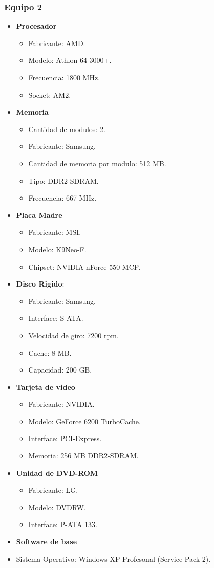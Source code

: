 \subsubsection{Equipo 2}
\begin{itemize}
\item \textbf{Procesador}
	\begin{itemize}
	\item Fabricante: AMD.	
	\item Modelo: Athlon 64 3000+.
	\item Frecuencia: 1800 MHz.
	\item Socket: AM2.
	\end{itemize}
\item \textbf{Memoria}
	\begin{itemize}
	\item Cantidad de modulos: 2.
	\item Fabricante: Samsung.
	\item Cantidad de memoria por modulo: 512 MB.
	\item Tipo: DDR2-SDRAM.
	\item Frecuencia: 667 MHz.
	\end{itemize}
\item \textbf{Placa Madre}
	\begin{itemize}
	\item Fabricante: MSI.	
	\item Modelo: K9Neo-F.
	\item Chipset: NVIDIA nForce 550 MCP.
	\end{itemize}
\item \textbf{Disco Rigido}:
	\begin{itemize}
	\item Fabricante: Samsung.	
	\item Interface: S-ATA.
	\item Velocidad de giro: 7200 rpm.
	\item Cache: 8 MB.
	\item Capacidad: 200 GB.
	\end{itemize}
\item \textbf{Tarjeta de video}
	\begin{itemize}
	\item Fabricante: NVIDIA.
	\item Modelo: GeForce 6200 TurboCache.
	\item Interface: PCI-Express.
	\item Memoria: 256 MB DDR2-SDRAM.
	\end{itemize}
\item \textbf{Unidad de DVD-ROM}
	\begin{itemize}
	\item Fabricante: LG.
	\item Modelo: DVDRW.
	\item Interface: P-ATA 133.
	\end{itemize}
\item \textbf{Software de base}
	\item Sistema Operativo: Windows XP Profesonal (Service Pack 2).
\end{itemize} 
